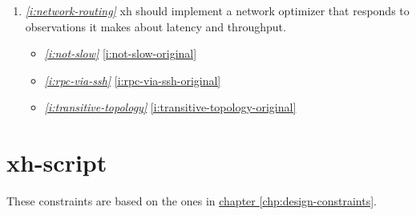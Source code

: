 \documentclass{report}
\makeatletter
\newcommand{\Ref}[2]{\hyperref[#2]{#1 \ref*{#2}}}
\newcommand*{\Label}[2]{%
  \@bsphack
  \begingroup
    \label{#1-original}%
    \def\@currentlabel{#2}%
    \label{#1}%
  \endgroup
  \@esphack
}
\newcommand{\refboth}[1]{{\em \ref{#1}} \ref{#1-original}}
\makeatother
\begin{document}
\begin{enumerate}
\begin{itemize}
\item \refboth{i:no-root-access}
\item \refboth{i:rpc-via-ssh}
\end{itemize}
\item{}\Label{i:network-routing}{routing}{\em\ref{i:network-routing}}
  xh should implement a network optimizer that responds to observations it
  makes about latency and throughput.
\begin{itemize}
\item \refboth{i:not-slow}
\item \refboth{i:rpc-via-ssh}
\item \refboth{i:transitive-topology}
\end{itemize}
\end{enumerate}

\chapter{xh-script}\label{chp:design-xh-script}
  These constraints are based on the ones in
  \Ref{chapter}{chp:design-constraints}.
\end{document}
